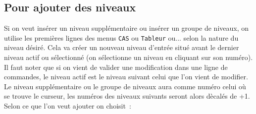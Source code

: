 \documentclass[a4paper,11pt]{article}
\begin{document}
\subsection{Pour ajouter des niveaux}
Si on veut ins\'erer un niveau suppl\'ementaire ou ins\'erer un groupe de 
niveaux, on utilise les premi\`eres lignes des menus {\tt CAS} ou {\tt Tableur}
ou... selon la nature du niveau d\'esir\'e. Cela va cr\'eer un nouveau niveau 
d'entr\'ee situ\'e avant le dernier 
niveau actif ou s\'electionn\'e (on s\'electionne un niveau en cliquant sur 
son num\'ero). Il faut noter que si on vient de valider une modification dans 
une ligne de commandes, le niveau actif est le niveau suivant celui que l'on 
vient de modifier.\\
Le niveau suppl\'ementaire ou le groupe de niveaux aura comme num\'ero 
celui  o\`u se trouve le curseur, les num\'eros des niveaux suivants seront 
alors d\`ecal\'es de +1. Selon ce que l'on veut ajouter on choisit~:
\end{document}
